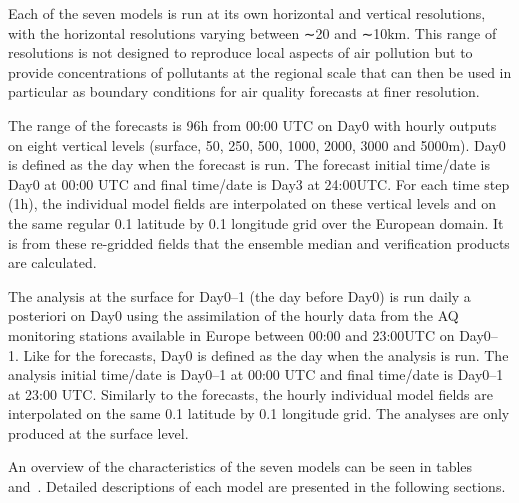 \documentclass[9pt]{report}
\begin{document}
\noindent{}Each of the seven models is run at its own horizontal and vertical resolutions, with the horizontal resolutions varying between ∼20 and ∼10km. 
This range of resolutions is not designed to reproduce local aspects of air pollution but to provide concentrations of pollutants at the regional scale that can then be used in particular as boundary conditions for air quality forecasts at finer resolution.%

The range of the forecasts is 96h from 00:00 UTC on Day0 with hourly outputs on eight vertical levels (surface, 50, 250, 500, 1000, 2000, 3000 and 5000m). 
Day0 is defined as the day when the forecast is run. 
The forecast initial time/date is Day0 at 00:00 UTC and final time/date is Day3 at 24:00UTC. 
For each time step (1h), the individual model fields are interpolated on these vertical levels and on the same regular 0.1\textdegree{} latitude by 0.1\textdegree{} longitude grid over the European domain. 
It is from these re-gridded fields that the ensemble median and verification products are calculated.%

The analysis at the surface for Day0–1 (the day before Day0) is run daily a posteriori on Day0 using the assimilation of the hourly data from the AQ monitoring stations available in Europe between 00:00 and 23:00UTC on Day0– 1. 
Like for the forecasts, Day0 is defined as the day when the analysis is run. 
The analysis initial time/date is Day0–1 at 00:00 UTC and final time/date is Day0–1 at 23:00 UTC. 
Similarly to the forecasts, the hourly individual model fields are interpolated on the same 0.1\textdegree{} latitude by 0.1\textdegree{} longitude grid. 
The analyses are only produced at the surface level.%

An overview of the characteristics of the seven models can be seen in tables~ and~.
Detailed descriptions of each model are presented in the following sections.%
\end{document}
